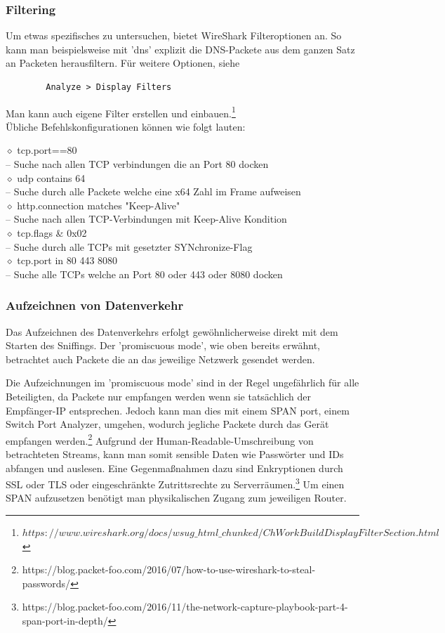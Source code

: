 \documentclass[11pt]{article}
\begin{document}
    \subsubsection{Filtering}
    Um etwas spezifisches zu untersuchen, bietet WireShark Filteroptionen an.
    So kann man beispielsweise mit 'dns' explizit die DNS-Packete aus dem ganzen Satz an Packeten herausfiltern.
    Für weitere Optionen, siehe
    \begin{verbatim}
        Analyze > Display Filters
    \end{verbatim}
    Man kann auch eigene Filter erstellen und einbauen.\footnote[1]{$https://www.wireshark.org/docs/wsug\_html\_chunked/ChWorkBuildDisplayFilterSection.html$}\\
    Übliche Befehlskonfigurationen können wie folgt lauten:
    \begin{addmargin}[1em]{1em}
        $\diamond$ tcp.port==80\\
            -- Suche nach allen TCP verbindungen die an Port 80 docken\\
        $\diamond$ udp contains 64\\
            -- Suche durch alle Packete welche eine x64 Zahl im Frame aufweisen\\
        $\diamond$ http.connection matches "Keep-Alive"\\
            -- Suche nach allen TCP-Verbindungen mit Keep-Alive Kondition\\
        $\diamond$ tcp.flags \& 0x02 \\
            -- Suche durch alle TCPs mit gesetzter SYNchronize-Flag\\
        $\diamond$ tcp.port in {80 443 8080}\\
            -- Suche alle TCPs welche an Port 80 oder 443 oder 8080 docken\\
    \end{addmargin}

    \subsubsection{Aufzeichnen von Datenverkehr}
    Das Aufzeichnen des Datenverkehrs erfolgt gewöhnlicherweise direkt mit dem Starten des Sniffings.
    Der 'promiscuous mode', wie oben bereits erwähnt, betrachtet auch Packete die an das jeweilige Netzwerk gesendet werden.

    Die Aufzeichnungen im 'promiscuous mode' sind in der Regel ungefährlich für alle Beteiligten, da Packete nur empfangen werden wenn sie
    tatsächlich der Empfänger-IP entsprechen. Jedoch kann man dies mit einem SPAN port, einem Switch Port Analyzer, umgehen, wodurch
    jegliche Packete durch das Gerät empfangen werden.\footnote[2]{https://blog.packet-foo.com/2016/07/how-to-use-wireshark-to-steal-passwords/}
    Aufgrund der Human-Readable-Umschreibung von betrachteten Streams, kann man somit sensible Daten wie Passwörter und IDs abfangen und auslesen.
    Eine Gegenmaßnahmen dazu sind Enkryptionen durch SSL oder TLS oder eingeschränkte Zutrittsrechte zu Serverräumen.\footnote[3]{https://blog.packet-foo.com/2016/11/the-network-capture-playbook-part-4-span-port-in-depth/}
    Um einen SPAN aufzusetzen benötigt man physikalischen Zugang zum jeweiligen Router.
\end{document}
